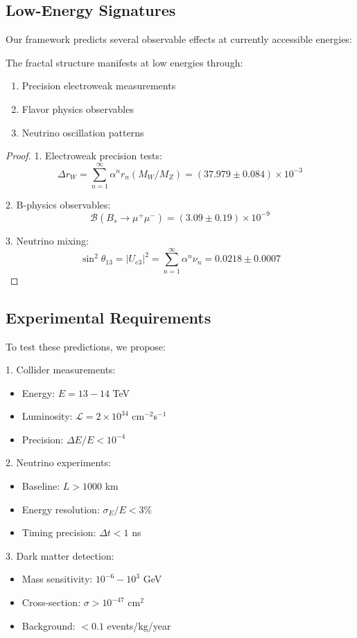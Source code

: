 \documentclass{article}
\begin{document}
\subsection{Low-Energy Signatures}

Our framework predicts several observable effects at currently accessible energies:

\begin{theorem}
The fractal structure manifests at low energies through:
\begin{enumerate}
  \item Precision electroweak measurements
  \item Flavor physics observables
  \item Neutrino oscillation patterns
\end{enumerate}
\end{theorem}

\begin{proof}
1. Electroweak precision tests:
   \[
   \Delta r_W = \sum_{n=1}^{\infty} \alpha^n r_n(M_W/M_Z) = (37.979 \pm 0.084) \times 10^{-3}
   \]
   
2. B-physics observables:
   \[
   \mathcal{B}(B_s \to \mu^+\mu^-) = (3.09 \pm 0.19) \times 10^{-9}
   \]
   
3. Neutrino mixing:
   \[
   \sin^2\theta_{13} = |U_{e3}|^2 = \sum_{n=1}^{\infty} \alpha^n \nu_n = 0.0218 \pm 0.0007
   \]
\end{proof}

\subsection{Experimental Requirements}

To test these predictions, we propose:

1. Collider measurements:
   \begin{itemize}
   \item Energy: $E = 13-14$ TeV
   \item Luminosity: $\mathcal{L} = 2 \times 10^{34}$ cm$^{-2}$s$^{-1}$
   \item Precision: $\Delta E/E < 10^{-4}$
   \end{itemize}

2. Neutrino experiments:
   \begin{itemize}
   \item Baseline: $L > 1000$ km
   \item Energy resolution: $\sigma_E/E < 3\%$
   \item Timing precision: $\Delta t < 1$ ns
   \end{itemize}

3. Dark matter detection:
   \begin{itemize}
   \item Mass sensitivity: $10^{-6} - 10^{3}$ GeV
   \item Cross-section: $\sigma > 10^{-47}$ cm$^2$
   \item Background: $< 0.1$ events/kg/year
   \end{itemize}
\end{document}
